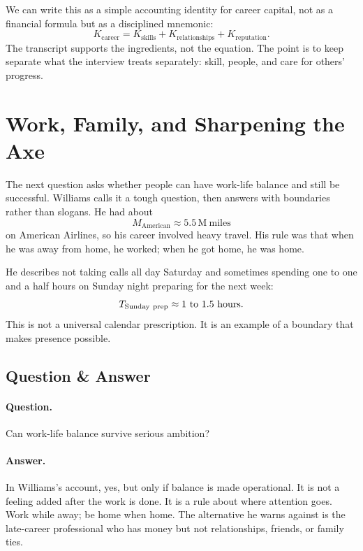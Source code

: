 We can write this as a simple accounting identity for career capital, not as a financial formula but as a disciplined mnemonic:
\begin{equation}
K_{\mathrm{career}}
=
K_{\mathrm{skills}}
+
K_{\mathrm{relationships}}
+
K_{\mathrm{reputation}}.
\end{equation}
The transcript supports the ingredients, not the equation. The point is to keep separate what the interview treats separately: skill, people, and care for others' progress.

\section{Work, Family, and Sharpening the Axe}

The next question asks whether people can have work-life balance and still be successful. Williams calls it a tough question, then answers with boundaries rather than slogans. He had about
\begin{equation}
M_{\mathrm{American}} \approx 5.5\,\mathrm{M\ miles}
\end{equation}
on American Airlines, so his career involved heavy travel. His rule was that when he was away from home, he worked; when he got home, he was home.

He describes not taking calls all day Saturday and sometimes spending one to one and a half hours on Sunday night preparing for the next week:
\begin{equation}
T_{\mathrm{Sunday\ prep}} \approx 1\hbox{ to }1.5\ \mathrm{hours}.
\end{equation}
This is not a universal calendar prescription. It is an example of a boundary that makes presence possible.

\subsection{Question \& Answer}

\paragraph{Question.} Can work-life balance survive serious ambition?

\paragraph{Answer.} In Williams's account, yes, but only if balance is made operational. It is not a feeling added after the work is done. It is a rule about where attention goes. Work while away; be home when home. The alternative he warns against is the late-career professional who has money but not relationships, friends, or family ties.


